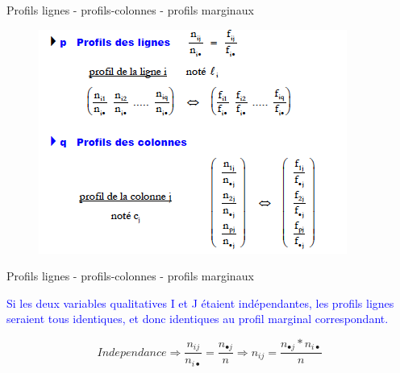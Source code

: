 \documentclass[12pt]{beamer}
\begin{document}
\begin{frame}{Profils lignes - profils-colonnes - profils
marginaux}
\begin{figure}
\includegraphics[scale=0.7]{exemple9.png}  
\end{figure}
\end{frame}



%
%


\begin{frame}{Profils lignes - profils-colonnes - profils
marginaux}

\textcolor{blue}{Si les deux variables qualitatives I et J étaient indépendantes, les profils lignes seraient tous identiques, et donc identiques au profil marginal
correspondant.}

$$Independance \Rightarrow \frac{n_{ij}}{n_{i \bullet}}=\frac{n_{\bullet j}}{n} \Rightarrow n_{ij}=\frac{n_{\bullet j}*n_{i \bullet}}{n}$$

\end{frame}
\end{document}
